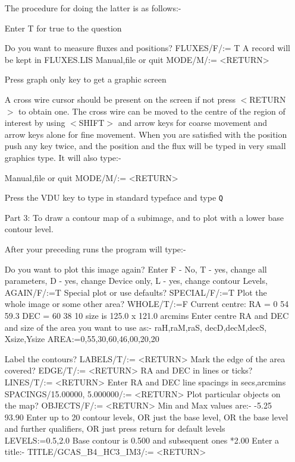 \documentclass[nolof,noabs,11pt]{starlink}
\begin{document}
\begin{itemize}
The procedure for doing the latter is as follows:-

Enter T for true to the question
\begin{terminalv}
Do you want to measure fluxes and positions?
FLUXES/F/:= T
A record will be kept in FLUXES.LIS
Manual,file or quit
MODE/M/:= <RETURN>
\end{terminalv}
Press graph only key to get a graphic screen

A cross wire cursor should be present on the screen if not press $<$RETURN$>$ to
obtain one. The cross wire can be moved to the centre of the region of interest
by using $<$SHIFT$>$ and arrow keys for coarse movement and arrow keys alone for
fine movement. When you are satisfied with the position push any key twice, and
the position and the flux will be typed in very small graphics type. It will
also type:-
\begin{terminalv}
Manual,file or quit
MODE/M/:= <RETURN>
\end{terminalv}
Press the VDU key to type in standard typeface and type \texttt{Q}

\pagebreak
\item [Part 3:] To draw a contour map of a subimage, and to plot with a lower
base contour level.

After your preceding runs the program will type:-

\begin{terminalv}
Do you want to plot this image again?
Enter F - No,
     T - yes, change all parameters,
     D - yes, change Device only,
     L - yes, change contour Levels,
AGAIN/F/:=T
Special plot or use defaults?
SPECIAL/F/:=T
Plot the whole image or some other area?
WHOLE/T/:=F
Current centre:  RA =   0 54 59.3
               DEC =  60 38 10
   size is  125.0 x  121.0 arcmins
Enter centre RA and DEC and size of the area you want to use as:-
raH,raM,raS, decD,decM,decS, Xsize,Ysize
AREA:=0,55,30,60,46,00,20,20

Label the contours?
LABELS/T/:= <RETURN>
Mark the edge of the area covered?
EDGE/T/:= <RETURN>
RA and DEC in lines or ticks?
LINES/T/:= <RETURN>
Enter RA and DEC line spacings in secs,arcmins
SPACINGS/15.00000, 5.000000/:= <RETURN>
Plot particular objects on the map?
OBJECTS/F/:= <RETURN>
Min and Max values are:-       -5.25       93.90
Enter up to 20 contour levels,
OR just the base level,
OR the base level and further qualifiers,
OR just press return for default levels
LEVELS:=0.5,2.0
Base contour is 0.500 and subsequent ones *2.00
Enter a title:-
TITLE/GCAS_B4_HC3_IM3/:= <RETURN>
\end{terminalv}


\end{itemize}
\end{document}
